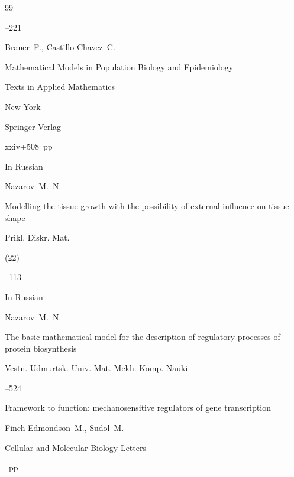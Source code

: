 \begin{thebibliography}{99}


--221 


 


\by    Brauer~F., Castillo-Chavez~C. 

\book Mathematical Models in Population Biology and Epidemio\-logy

\serial Texts in Applied Mathematics


\publaddr New York

\publ Springer Verlag


\totalpages xxiv+508~pp \nofrills


 


\lang In Russian

\by Nazarov~M.~N.

\paper Modelling the tissue growth with the possibility of external influence on tissue shape

\jour Prikl. Diskr. Mat.


(22)

--113




\lang In Russian

\by Nazarov~M.~N.

\paper The basic mathematical model for the description of regulatory processes of protein biosynthesis

\jour Vestn. Udmurtsk. Univ. Mat. Mekh. Komp. Nauki




--524







\paper  Framework to function: mechanosensitive regulators of gene transcription

\by     Finch-Edmondson~M., Sudol~M.

\jour   Cellular and Molecular Biology Letters




~pp \nofrills




\end{thebibliography}

 

% 

%  

% 